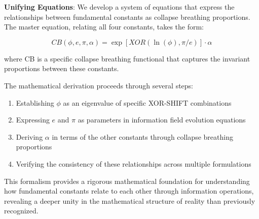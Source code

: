 \textbf{Unifying Equations}: We develop a system of equations that express the relationships between fundamental constants as collapse breathing proportions. The master equation, relating all four constants, takes the form:

\begin{equation}
CB(\phi, e, \pi, \alpha) = \exp[XOR(\ln(\phi), \pi/e)] \cdot \alpha
\end{equation}

where CB is a specific collapse breathing functional that captures the invariant proportions between these constants.

The mathematical derivation proceeds through several steps:

\begin{enumerate}
    \item Establishing $\phi$ as an eigenvalue of specific XOR-SHIFT combinations
    \item Expressing $e$ and $\pi$ as parameters in information field evolution equations
    \item Deriving $\alpha$ in terms of the other constants through collapse breathing proportions
    \item Verifying the consistency of these relationships across multiple formulations
\end{enumerate}

This formalism provides a rigorous mathematical foundation for understanding how fundamental constants relate to each other through information operations, revealing a deeper unity in the mathematical structure of reality than previously recognized. 